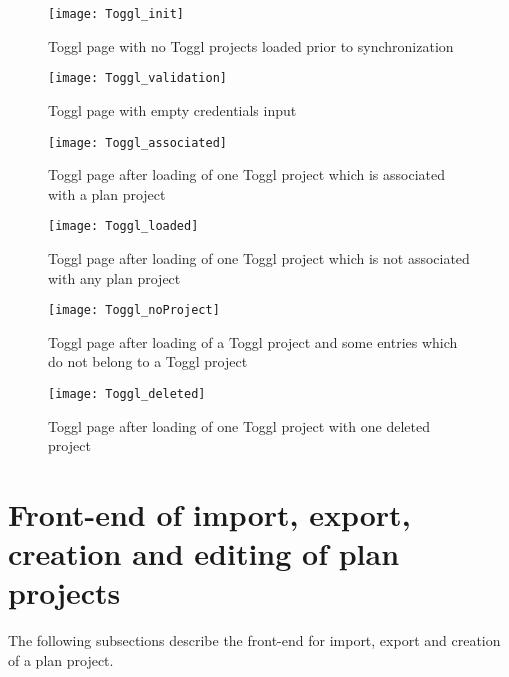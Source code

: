\begin{figure}[H]
	\centering
	\texttt{[image: Toggl\_init]}
	\caption{Toggl page with no Toggl projects loaded prior to synchronization}
	\label{Toggl page initial}
\end{figure}

\begin{figure}[H]
	\centering
	\texttt{[image: Toggl\_validation]}
	\caption{Toggl page with empty credentials input}
	\label{Toggl page validation}
\end{figure}

\begin{figure}[H]
	\centering
	\texttt{[image: Toggl\_associated]}
	\caption{Toggl page after loading of one Toggl project which is associated with a plan project}
	\label{Toggl associated}
\end{figure}

\begin{figure}[H]
	\centering
	\texttt{[image: Toggl\_loaded]}
	\caption{Toggl page after loading of one Toggl project which is not associated with any plan project}
	\label{Toggl loaded}
\end{figure}

\begin{figure}[H]
	\centering
	\texttt{[image: Toggl\_noProject]}
	\caption{Toggl page after loading of a Toggl project and some entries which do not belong to a Toggl project}
	\label{Toggl no project}
\end{figure}

\begin{figure}[H]
	\centering
	\texttt{[image: Toggl\_deleted]}
	\caption{Toggl page after loading of one Toggl project with one deleted project}
	\label{Toggl deleted}
\end{figure}

\section{Front-end of import, export, creation and editing of plan projects}
The following subsections describe the front-end for import, export and creation of a plan project.


